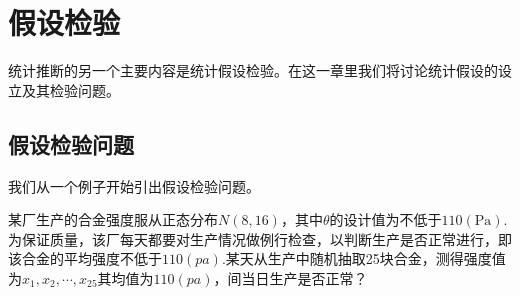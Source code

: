 \chapter{假设检验}
统计推断的另一个主要内容是统计假设检验。在这一章里我们将讨论统计假设的设立及其检验问题。

\section{假设检验问题}
我们从一个例子开始引出假设检验问题。
\begin{example}
某厂生产的合金强度服从正态分布$N(8,16)$，其中$\theta$的设计值为不低于$110(\si{\pascal})$.为保证质量，该厂每天都要对生产情况做例行检查，以判断生产是否正常进行，即该合金的平均强度不低于$110(pa)$.某天从生产中随机抽取25块合金，测得强度值为$x_{1},x_{2},\cdots,x_{25}$其均值为$110(pa)$，间当日生产是否正常？
\end{example}